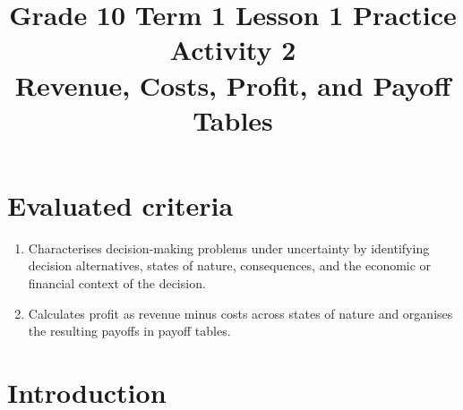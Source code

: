 \makeatletter
{}
\makeatother




\title{Grade 10 Term 1 Lesson 1 Practice Activity 2\\Revenue, Costs, Profit, and Payoff Tables}
\author{}
\date{}

\maketitle
\setcounter{tocdepth}{1}
\setcounter{secnumdepth}{2}
\label{toc}
\tableofcontents

\section*{Evaluated criteria}
\begin{enumerate}[label=\textbf{C\arabic*}]
\item Characterises decision-making problems under uncertainty by identifying decision alternatives, states of nature, consequences, and the economic or financial context of the decision.
\item[\textbf{C3}] Calculates profit as revenue minus costs across states of nature and organises the resulting payoffs in payoff tables.
\end{enumerate}

\section{Introduction}\label{sec:introduction}
\label{tone:legend}


\vspace{8mm}

